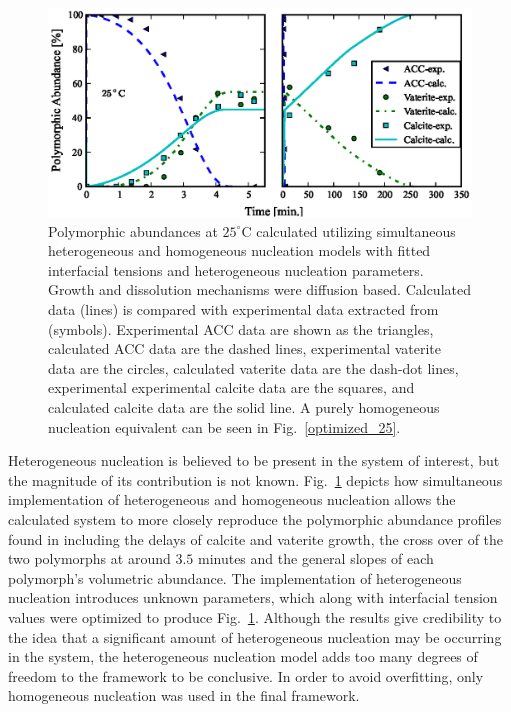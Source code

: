 \documentclass[preprint,3p,a4paper,times,12pt,authoryear]{elsarticle}
\begin{document}
\begin{figure}[!htbp]
\begin{center}
\includegraphics{fig_6_heterogeneous_nucleation}
\end{center}
\caption{Polymorphic abundances at $25^\circ$C calculated utilizing simultaneous heterogeneous and homogeneous nucleation models with fitted interfacial tensions and heterogeneous nucleation parameters.  Growth and dissolution mechanisms were diffusion based.  Calculated data (lines) is compared with experimental data extracted from \citep{Ogino1987} (symbols).  Experimental ACC data are shown as the triangles, calculated ACC data are the dashed lines, experimental vaterite data are the circles, calculated vaterite data are the dash-dot lines, experimental experimental calcite data are the squares, and calculated calcite data are the solid line.  A purely homogeneous nucleation equivalent can be seen in Fig.~\ref{optimized_25}.}
\label{hetero}
\end{figure}
Heterogeneous nucleation is believed to be present in the system of interest, but the magnitude of its contribution is not known.  Fig.~\ref{hetero} depicts how simultaneous implementation of heterogeneous and homogeneous nucleation allows the calculated system to more closely reproduce the polymorphic abundance profiles found in \citeauthor{Ogino1987} including the delays of calcite and vaterite growth, the cross over of the two polymorphs at around $3.5$ minutes and the general slopes of each polymorph's volumetric abundance.  The implementation of heterogeneous nucleation introduces unknown parameters, which along with interfacial tension values were optimized to produce Fig.~\ref{hetero}.  Although  the results give credibility to the idea that a significant amount of heterogeneous nucleation may be occurring in the system, the heterogeneous nucleation model adds too many degrees of freedom to the framework to be conclusive.  In order to avoid overfitting, only homogeneous nucleation was used in the final framework.
\end{document}
